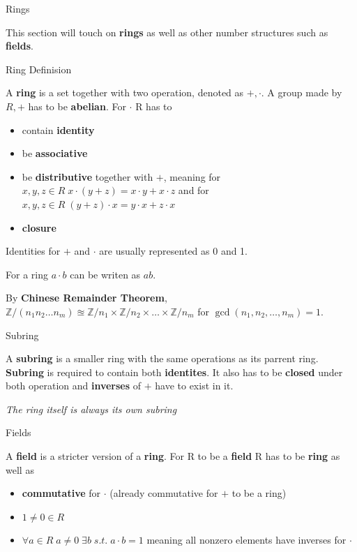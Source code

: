 \documentclass[12pt, letterpaper]{article}
\begin{document}
\begin{section}{Rings}

  This section will touch on \textbf{rings} as well as other number structures
  such as \textbf{fields}.

  \begin{subsection}{Ring Definision}

    A \textbf{ring} is a set together with two operation, denoted as \(+, \cdot\).
    A group made by \(R, +\) has to be \textbf{abelian}. For \(\cdot\) R has to
    \begin{itemize}
      \item contain \textbf{identity}
      \item be \textbf{associative}
      \item be \textbf{distributive} together with \(+\), meaning
            for \(x, y, z \in R \; x \cdot (y + z) = x \cdot y + x \cdot z\) and
            for \(x, y, z \in R \; (y + z) \cdot x = y \cdot x + z \cdot x\)
      \item \textbf{closure}
    \end{itemize}

    Identities for \(+\) and \(\cdot\) are usually represented as 0 and 1.

    For a ring \(a \cdot b\) can be writen as \(ab\).

    By \textbf{Chinese Remainder Theorem},
    \(\mathbb{Z}/(n_{1}n_{2} \dots n_{m}) \approxeq \mathbb{Z}/n_{1} \times
    \mathbb{Z}/n_{2} \times \dots \times \mathbb{Z}/n_{m}\) for
    \(\gcd(n_{1}, n_{2}, \dots , n_{m}) = 1\).

  \end{subsection}

  \begin{subsection}{Subring}

    A \textbf{subring} is a smaller ring with the same operations as its
    parrent ring. \textbf{Subring} is required to contain both \textbf{identites}.
    It also has to be \textbf{closed} under both operation and \textbf{inverses}
    of \(+\) have to exist in it.

    \emph{The ring itself is always its own subring}

  \end{subsection}

  \begin{subsection}{Fields}

    A \textbf{field} is a stricter version of a \textbf{ring}. For R to be a
    \textbf{field} R has to be \textbf{ring} as well as
    \begin{itemize}
      \item \textbf{commutative} for \(\cdot\)
            (already commutative for \(+\) to be a ring)
      \item \(1 \neq 0 \in R\)
      \item \(\forall a \in R \; a \neq 0 \; \exists b \; s.t. \; a \cdot b = 1\)
            meaning all nonzero elements have inverses for \(\cdot\)
    \end{itemize}


\end{subsection}
\end{section}
\end{document}

